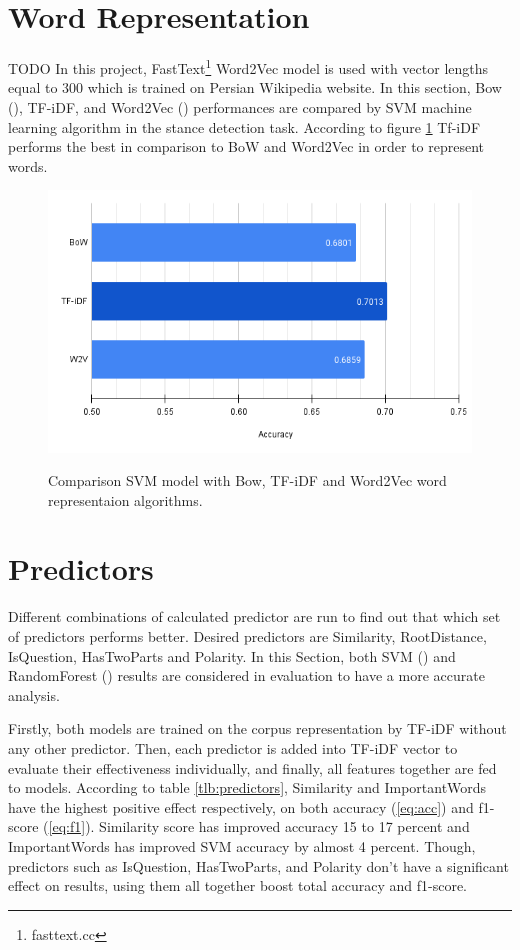 \section{Word Representation}
{\color{green}TODO}
In this project, FastText\footnote{fasttext.cc} Word2Vec model is used with vector lengths equal to 300 which is trained on Persian Wikipedia website.
In this section, Bow (\cite{bow}), TF-iDF, and Word2Vec (\cite{word2vec}) performances are compared by SVM machine learning algorithm in the stance detection task. According to figure \ref{fig:wordrep} Tf-iDF performs the best in comparison to BoW and Word2Vec in order to represent words.
\begin{figure}%
	\centering
	{\includegraphics[width=12.5cm]{statistics/WordRep.png} }
	\caption{Comparison SVM model with Bow, TF-iDF and Word2Vec word representaion algorithms.}%
	\label{fig:wordrep}%
\end{figure}

\section{Predictors}
\label{sec:predictors}
Different combinations of calculated predictor are run to find out that which set of predictors performs better. Desired predictors are Similarity, RootDistance, IsQuestion, HasTwoParts and Polarity. In this Section, both SVM (\cite{svc}) and RandomForest (\cite{randomforest}) results are considered in evaluation to have a more accurate analysis.

Firstly, both models are trained on the corpus representation by TF-iDF without any other predictor. Then, each predictor is added into TF-iDF vector to evaluate their effectiveness individually, and finally, all features together are fed to models. According to table \ref{tlb:predictors}, Similarity and ImportantWords have the highest positive effect respectively, on both accuracy (\ref{eq:acc}) and f1-score (\ref{eq:f1}). Similarity score has improved accuracy 15 to 17 percent and ImportantWords has improved SVM accuracy by almost 4 percent. Though, predictors such as IsQuestion, HasTwoParts, and Polarity don't have a significant effect on results, using them all together boost total accuracy and f1-score. 

